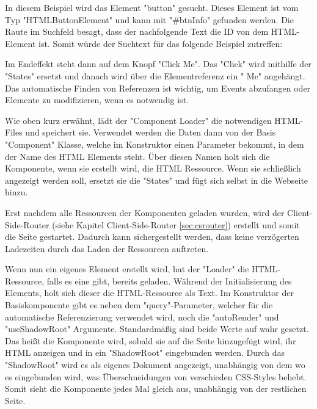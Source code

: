 
In diesem Beispiel wird das Element "button" gesucht. Dieses Element ist vom Typ "HTMLButtonElement" und kann mit "{\ttfamily \#btnInfo}" gefunden werden. Die Raute im Suchfeld besagt, dass der nachfolgende Text die ID von dem HTML-Element ist. Somit würde der Suchtext für das folgende Beispiel zutreffen:


Im Endeffekt steht dann auf dem Knopf "Click Me". Das "Click" wird mithilfe der
"States" ersetzt und danach wird über die Elementreferenz ein " Me" angehängt. Das automatische Finden von Referenzen ist wichtig, um Events abzufangen oder Elemente zu modifizieren, wenn es notwendig ist.

Wie oben kurz erwähnt, lädt der "Component Loader" die notwendigen HTML-Files und speichert sie. Verwendet werden die Daten dann von der Basis "Component" Klasse, welche im Konstruktor einen Parameter bekommt, in dem der Name des HTML Elements steht. Über diesen Namen holt sich die Komponente, wenn sie erstellt wird, die HTML Ressource. Wenn sie schließlich angezeigt werden soll, ersetzt sie die "States" und fügt sich selbst in die Webseite hinzu.


Erst nachdem alle Ressourcen der Komponenten geladen wurden, wird der Client-Side-Router (siehe Kapitel Client-Side-Router \ref{sec:csrouter}) erstellt und somit die Seite gestartet. Dadurch kann sichergestellt werden, dass keine verzögerten Ladezeiten durch das Laden der Ressourcen auftreten.


Wenn nun ein eigenes Element erstellt wird, hat der "Loader" die HTML-Ressource, falls es eine gibt, bereits geladen. Während der Initialisierung des Elements, holt sich dieser die HTML-Ressource als Text. Im Konstruktor der Basiskomponente gibt es neben dem "query"-Parameter, welcher für die automatische Referenzierung verwendet wird, noch die "autoRender" und "useShadowRoot" Argumente. Standardmäßig sind beide Werte auf wahr gesetzt. Das heißt die Komponente wird, sobald sie auf die Seite hinzugefügt wird, ihr HTML anzeigen und in ein "ShadowRoot" eingebunden werden. Durch das "ShadowRoot" wird es als eigenes Dokument angezeigt, unabhängig von dem wo es eingebunden wird, was Überschneidungen von verschieden CSS-Styles behebt. Somit sieht die Komponente jedes Mal gleich aus, unabhängig von der restlichen Seite.


